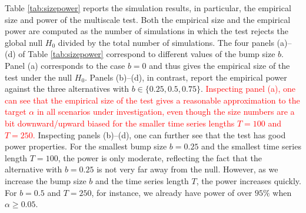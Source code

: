 \documentclass[12pt]{article}
\begin{document}
Table \ref{tab:sizepower} reports the simulation results, in particular, the empirical size and power of the multiscale test. Both the empirical size and the empirical power are computed as the number of simulations in which the test rejects the global null $H_0$ divided by the total number of simulations.
The four panels (a)--(d) of Table \ref{tab:sizepower} correspond to different values of the bump size $b$. Panel (a) corresponds to the case $b=0$ and thus gives the empirical size of the test under the null $H_0$. Panels (b)--(d), in contrast, report the empirical power against the three alternatives with $b \in \{0.25,0.5,0.75\}$.
\textcolor{red}{Inspecting panel (a), one can see that the empirical size of the test gives a reasonable approximation to the target $\alpha$ in all scenarios under investigation, even though the size numbers are a bit downward/upward biased for the smaller time series lengths $T=100$ and $T=250$.}
Inspecting panels (b)--(d), one can further see that the test has good power properties. For the smallest bump size $b = 0.25$ and the smallest time series length $T = 100$, the power is only moderate, reflecting the fact that the alternative with $b = 0.25$ is not very far away from the null. However, as we increase the bump size $b$ and the time series length $T$, the power increases quickly. For $b = 0.5$ and $T=250$, for instance, we already have power of over $95\%$ when $\alpha \ge 0.05$.
\end{document}
